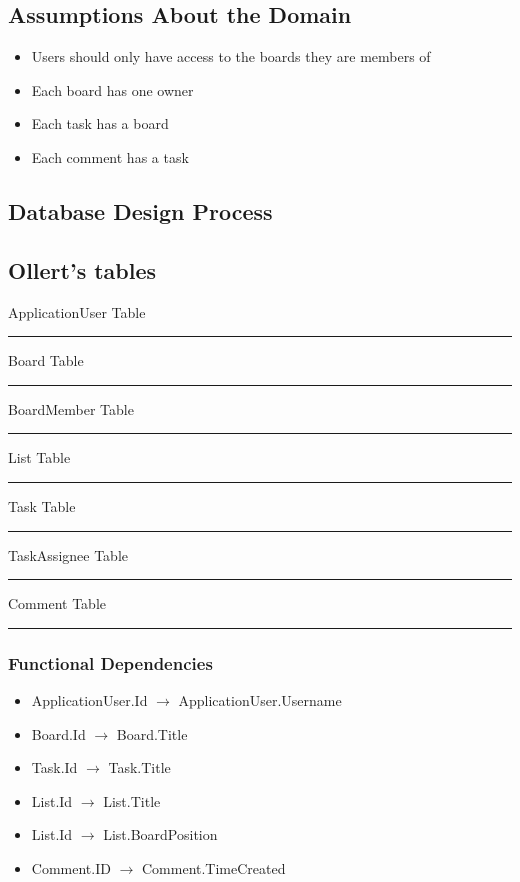 \documentclass[letterpaper]{article}
\begin{document}
\subsection{Assumptions About the Domain}
  \begin{itemize}
    \item Users should only have access to the boards they are members of
    \item Each board has one owner
    \item Each task has a board
    \item Each comment has a task
  \end{itemize}

\subsection{Database Design Process}

\subsection{Ollert's tables}
ApplicationUser Table
\hrule
Board Table
\pagebreak
\hrule
BoardMember Table
\hrule
List Table
\hrule
Task Table
\hrule
TaskAssignee Table
\hrule
Comment Table
\hrule
\pagebreak
\subsubsection{Functional Dependencies}
  \begin{itemize}
    \item ApplicationUser.Id $\rightarrow$ ApplicationUser.Username
    \item Board.Id $\rightarrow$ Board.Title
    \item Task.Id $\rightarrow$ Task.Title
    \item List.Id $\rightarrow$ List.Title
    \item List.Id $\rightarrow$ List.BoardPosition
    \item Comment.ID $\rightarrow$ Comment.TimeCreated
  \end{itemize}
\end{document}
